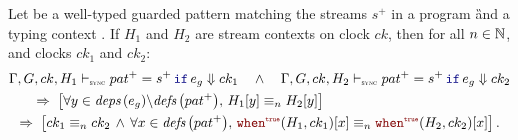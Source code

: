 \begin{lemma}
    \label{lem:semantics:grsync:theorems:determinism:pat}
    Let  be a well-typed guarded pattern matching the streams $s^+$ in a
    program \G and a typing context \tyCtx. If $H_1$ and $H_2$ are stream contexts on clock $ck$,
    then for all $n \in \mathbb{N}$, and clocks $ck_1$ and $ck_2$:
    \begin{multline*}
       \patDenot{H_1}{ck}{\guarded{pat^+ = s^+}{e_g}}{ck_1} \quad \wedge \quad  \patDenot{H_2}{ck}{\guarded{pat^+ = s^+}{e_g}}{ck_2} \\
        \qquad \Rightarrow \;
        \left[\forall y \in \deps{e_g} \backslash \defs{pat^+}, \, H_1[y] \equiv_n H_2[y]\right] \hfill
        \\ \Rightarrow \;
        \left[
            ck_1 \equiv_n ck_2 \, \wedge \, \forall x \in \defs{pat^+}, \, \whenT{H_1}{ck_1}[x]
            \equiv_n \whenT{H_2}{ck_2}[x]
            \right].
    \end{multline*}
\end{lemma}

